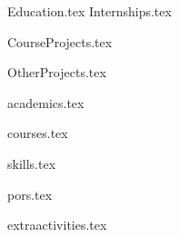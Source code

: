 \documentclass[11pt, a4paper]{awesome-cv}
\newcommand*{\sectiondir}{resume/}
\begin{document}
\makecvheader[C]

{Education.tex}
\vspace*{-0.8cm}
{Internships.tex}

\vspace*{-0.56cm}
{CourseProjects.tex}

\vspace*{-0.56cm}
{OtherProjects.tex}

\vspace*{-0.56cm}
{academics.tex}


\vspace*{-0.56cm}
{courses.tex}

\vspace*{-0.56cm}
{skills.tex}

\vspace*{-0.56cm}
{pors.tex}

\vspace*{-0.56cm}
{extraactivities.tex}







\end{document}
